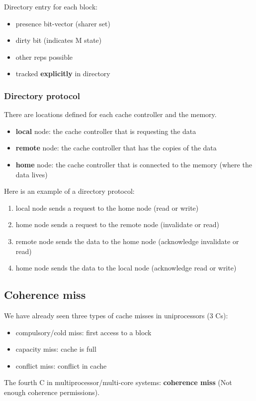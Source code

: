 \documentclass[letterpaper,12pt]{article}
\begin{document}
Directory entry for each block: \begin{itemize}
    \item presence bit-vector (sharer set)
    \item dirty bit (indicates M state)
    \item other reps possible
    \item tracked \textbf{explicitly} in directory
\end{itemize}
\subsubsection{Directory protocol}
There are locations defined for each cache controller and the memory.\begin{itemize}
    \item \textbf{local} node: the cache controller that is requesting the data
    \item \textbf{remote} node: the cache controller that has the copies of the data
    \item \textbf{home} node: the cache controller that is connected to the memory (where the data lives)
\end{itemize}

Here is an example of a directory protocol:\begin{enumerate}
    \item local node sends a request to the home node (read or write)
    \item home node sends a request to the remote node (invalidate or read)
    \item remote node sends the data to the home node (acknowledge invalidate or read)
    \item home node sends the data to the local node (acknowledge read or write)
\end{enumerate}

\subsection{Coherence miss}
We have already seen three types of cache misses in uniprocessors (3 Cs): \begin{itemize}
    \item compulsory/cold miss: first access to a block
    \item capacity miss: cache is full
    \item conflict miss: conflict in cache
\end{itemize}
The fourth C in multiprocessor/multi-core systems: \textbf{coherence miss} (Not enough coherence permissions).
\end{document}
